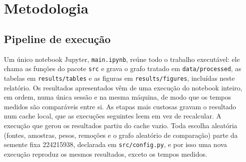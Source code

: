 \section{Metodologia}
\label{sec:metodologia}

\subsection{Pipeline de execução}

Um único notebook Jupyter, \texttt{main.ipynb}, reúne todo o trabalho executável: ele chama as funções do pacote \texttt{src} e grava o grafo tratado em \texttt{data/processed}, as tabelas em \texttt{results/tables} e as figuras em \texttt{results/figures}, incluídas neste relatório. Os resultados apresentados vêm de uma execução do notebook inteiro, em ordem, numa única sessão e na mesma máquina, de modo que os tempos medidos são comparáveis entre si. As etapas mais custosas gravam o resultado num cache local, que as execuções seguintes leem em vez de recalcular. A execução que gerou os resultados partiu do cache vazio. Toda escolha aleatória (fontes, amostras, pesos, remoções e o grafo aleatório de comparação) parte da semente fixa 224215938, declarada em \texttt{src/config.py}, e por isso uma nova execução reproduz os mesmos resultados, exceto os tempos medidos.

